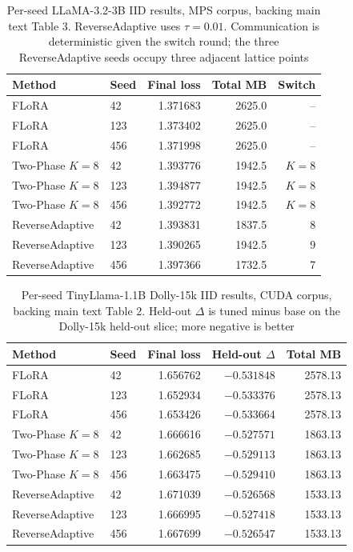 \documentclass[pdflatex,sn-nature]{sn-jnl}
\begin{document}
\begin{table}[tbp]
\centering
\footnotesize
\setlength{\tabcolsep}{6pt}
\caption{Per-seed LLaMA-3.2-3B IID results, MPS corpus, backing main text Table 3. ReverseAdaptive uses $\tau{=}0.01$. Communication is deterministic given the switch round; the three ReverseAdaptive seeds occupy three adjacent lattice points}
\label{tab:b3}
\begin{tabular}{@{}llrrr@{}}
\toprule
Method & Seed & Final loss & Total MB & Switch \\
\midrule
FLoRA & 42 & 1.371683 & 2625.0 & -- \\
FLoRA & 123 & 1.373402 & 2625.0 & -- \\
FLoRA & 456 & 1.371998 & 2625.0 & -- \\
Two-Phase $K{=}8$ & 42 & 1.393776 & 1942.5 & $K{=}8$ \\
Two-Phase $K{=}8$ & 123 & 1.394877 & 1942.5 & $K{=}8$ \\
Two-Phase $K{=}8$ & 456 & 1.392772 & 1942.5 & $K{=}8$ \\
ReverseAdaptive & 42 & 1.393831 & 1837.5 & 8 \\
ReverseAdaptive & 123 & 1.390265 & 1942.5 & 9 \\
ReverseAdaptive & 456 & 1.397366 & 1732.5 & 7 \\
\bottomrule
\end{tabular}
\end{table}


\begin{table}[tbp]
\centering
\footnotesize
\setlength{\tabcolsep}{6pt}
\caption{Per-seed TinyLlama-1.1B Dolly-15k IID results, CUDA corpus, backing main text Table 2. Held-out $\Delta$ is tuned minus base on the Dolly-15k held-out slice; more negative is better}
\label{tab:b4}
\begin{tabular}{@{}llrrr@{}}
\toprule
Method & Seed & Final loss & Held-out $\Delta$ & Total MB \\
\midrule
FLoRA & 42 & 1.656762 & $-0.531848$ & 2578.13 \\
FLoRA & 123 & 1.652934 & $-0.533376$ & 2578.13 \\
FLoRA & 456 & 1.653426 & $-0.533664$ & 2578.13 \\
Two-Phase $K{=}8$ & 42 & 1.666616 & $-0.527571$ & 1863.13 \\
Two-Phase $K{=}8$ & 123 & 1.662685 & $-0.529113$ & 1863.13 \\
Two-Phase $K{=}8$ & 456 & 1.663475 & $-0.529410$ & 1863.13 \\
ReverseAdaptive & 42 & 1.671039 & $-0.526568$ & 1533.13 \\
ReverseAdaptive & 123 & 1.666995 & $-0.527418$ & 1533.13 \\
ReverseAdaptive & 456 & 1.667699 & $-0.526547$ & 1533.13 \\
\bottomrule
\end{tabular}
\end{table}
\end{document}
